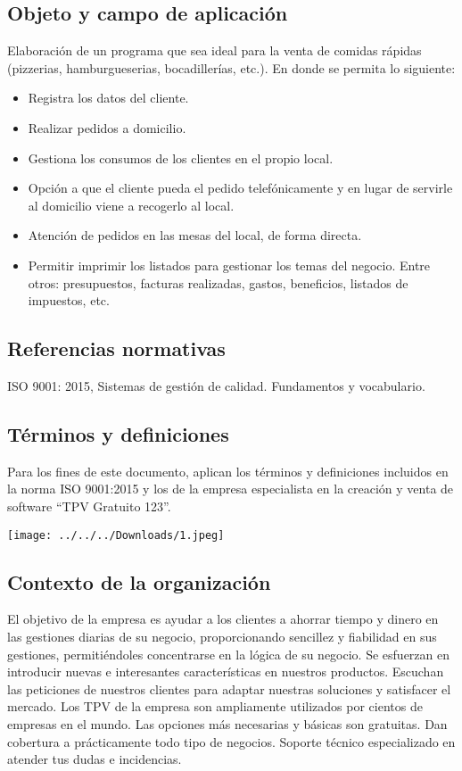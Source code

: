 \documentclass[12pt,a4paper]{article}
\begin{document}
\subsection{Objeto y campo de aplicación}
Elaboración de un programa que sea ideal para la venta de comidas rápidas (pizzerias, hamburgueserias, bocadillerías, etc.). En donde se permita lo siguiente:
\begin{itemize}
\item Registra los datos del cliente.
\item Realizar pedidos a domicilio.
\item Gestiona los consumos de los clientes en el propio local.
\item Opción a que el cliente pueda el pedido telefónicamente y en lugar de servirle al domicilio viene a recogerlo al local.
\item Atención de pedidos en las mesas del local, de forma directa.
\item Permitir imprimir los listados para gestionar los temas del negocio. Entre otros: presupuestos, facturas realizadas, gastos, beneficios, listados de impuestos, etc.
\end{itemize}

\subsection{Referencias normativas}
ISO 9001: 2015, Sistemas de gestión de calidad. Fundamentos y vocabulario.

\subsection{Términos y definiciones}
Para los fines de este documento, aplican los términos y definiciones incluidos en la norma ISO 9001:2015 y los de la empresa especialista en la creación y venta de software “TPV Gratuito 123”.
\begin{center}
\texttt{[image: ../../../Downloads/1.jpeg]}  
\end{center}

\subsection{Contexto de la organización}
El objetivo de la empresa es ayudar a los clientes a ahorrar tiempo y dinero en las gestiones diarias de su negocio, proporcionando sencillez y fiabilidad en sus gestiones, permitiéndoles concentrarse en la lógica de su negocio.
Se esfuerzan en introducir nuevas e interesantes características en nuestros productos.
Escuchan las peticiones de nuestros clientes para adaptar nuestras soluciones y satisfacer el mercado.
 Los TPV de la empresa son ampliamente utilizados por cientos de empresas en el mundo.
 Las opciones más necesarias y básicas son gratuitas.
 Dan cobertura a prácticamente todo tipo de negocios.
 Soporte técnico especializado en atender tus dudas e incidencias.
 
\end{document}
